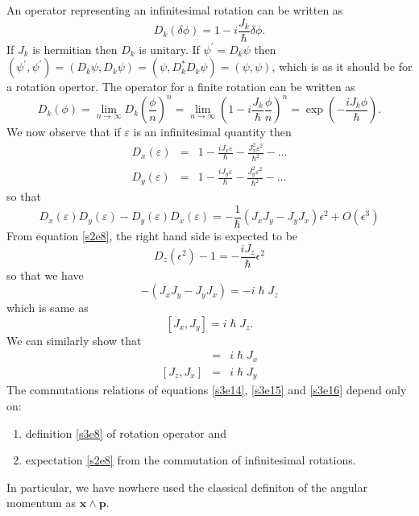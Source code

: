 \documentclass{article}
\numberwithin{equation}{section}
\let\vec\bm
\begin{document}
An operator representing an infinitesimal rotation can be written as
\begin{equation}\label{s3e7}
D_k(\delta\phi) = 1 - i\frac{J_k}{\hslash}\delta\phi.
\end{equation}
If $J_k$ is hermitian then $D_k$ is unitary. If $\psi^\prime = D_k\psi$ then
$(\psi^\prime, \psi^\prime) = (D_k\psi, D_k\psi) = (\psi, D_k^\ast D_k \psi)
= (\psi, \psi)$, which is as it should be for a rotation opertor. The operator
for a finite rotation can be written as
\begin{equation}\label{s3e8}
D_k(\phi) = \lim_{n \rightarrow \infty} D_k\left(\frac{\phi}{n}\right)^n =
\lim_{n \rightarrow \infty}\left(1-i\frac{J_k}{\hslash}\frac{\phi}{n}\right)^n
= \exp\left(-\frac{iJ_k\phi}{\hslash}\right).
\end{equation}
We now observe that if $\varepsilon$ is an infinitesimal quantity then
\begin{eqnarray}
D_x(\varepsilon) &=& 1 - \frac{iJ_x\varepsilon}{\hslash} - 
\frac{J_x^2 \varepsilon^2}{\hslash^2} - \ldots \label{s3e9} \\
D_y(\varepsilon) &=& 1 - \frac{iJ_y\varepsilon}{\hslash} - 
\frac{J_y^2 \varepsilon^2}{\hslash^2} - \ldots \label{s3e10} 
\end{eqnarray}
so that
\begin{equation}\label{s3e11}
D_x(\varepsilon)D_y(\varepsilon) - D_y(\varepsilon)D_x(\varepsilon) =
-\frac{1}{\hslash}(J_xJ_y-J_yJ_x)\epsilon^2+O(\epsilon^3)
\end{equation}
From equation \eqref{s2e8}, the right hand side is expected to be
\begin{equation}\label{s3e12}
D_z(\epsilon^2) - 1 = -\frac{iJ_z}{\hslash}\epsilon^2
\end{equation}
so that we have
\begin{equation}\label{s3e13}
-(J_xJ_y - J_yJ_x) = -i\hslash J_z
\end{equation}
which is same as
\begin{equation}\label{s3e14}
[J_x, J_y] = i\hslash J_z.
\end{equation}
We can similarly show that
\begin{eqnarray}
[J_y, J_z] &=& i\hslash J_x \label{s3e15} \\
{}[J_z, J_x] &=& i\hslash J_y \label{s3e16}
\end{eqnarray}
The commutations relations of equations \eqref{s3e14}, \eqref{s3e15}
and \eqref{s3e16} depend only on:
\begin{enumerate}
\item definition \eqref{s3e8} of rotation operator and
\item expectation \eqref{s2e8} from the commutation of infinitesimal
rotations.
\end{enumerate}
In particular, we have nowhere used the classical definiton of the
angular momentum as $\vec{x} \wedge \vec{p}$.
\end{document}
